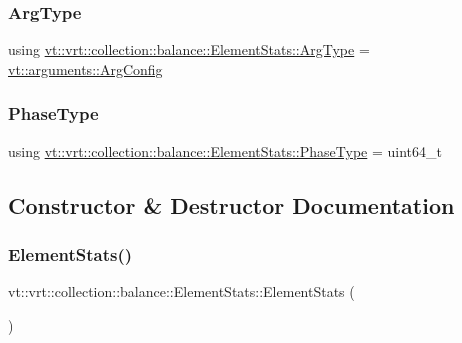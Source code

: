 \subsubsection{\texorpdfstring{Arg\+Type}{ArgType}}
{\footnotesize\ttfamily using \hyperlink{structvt_1_1vrt_1_1collection_1_1balance_1_1_element_stats_a0c7e7b8fa38003b72320906f18a6ca71}{vt\+::vrt\+::collection\+::balance\+::\+Element\+Stats\+::\+Arg\+Type} =  \hyperlink{structvt_1_1arguments_1_1_arg_config}{vt\+::arguments\+::\+Arg\+Config}}

\mbox{\label{structvt_1_1vrt_1_1collection_1_1balance_1_1_element_stats_a6edee983bb2ae96a341763520af33c66}} 
\subsubsection{\texorpdfstring{Phase\+Type}{PhaseType}}
{\footnotesize\ttfamily using \hyperlink{structvt_1_1vrt_1_1collection_1_1balance_1_1_element_stats_a6edee983bb2ae96a341763520af33c66}{vt\+::vrt\+::collection\+::balance\+::\+Element\+Stats\+::\+Phase\+Type} =  uint64\+\_\+t}



\subsection{Constructor \& Destructor Documentation}
\mbox{\label{structvt_1_1vrt_1_1collection_1_1balance_1_1_element_stats_a4d88e9b2f7981d7f98889fa9bea01d73}} 
\subsubsection{\texorpdfstring{Element\+Stats()}{ElementStats()}\hspace{0.1cm}{\footnotesize\ttfamily [1/3]}}
{\footnotesize\ttfamily vt\+::vrt\+::collection\+::balance\+::\+Element\+Stats\+::\+Element\+Stats (\begin{DoxyParamCaption}{ }\end{DoxyParamCaption})\hspace{0.3cm}{\ttfamily [default]}}

